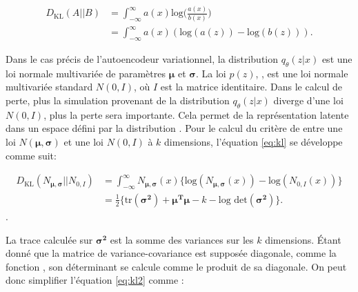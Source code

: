 \begin{equation}  \label{eq:kl}
	\begin{aligned}
		D_{\text{KL}}(A || B) &= \int_{-\infty}^{\infty} a(x) \text{log} \Big(\frac{a(x)}{b(x)}\Big)  \\
		 &= \int_{-\infty}^{\infty} a(x) (\text{log}(a(z)) - \text{log}(b(z))).
	\end{aligned}
\end{equation}

Dans le cas précis de l'autoencodeur variationnel, la distribution $q_{\theta}(z|x)$ est une loi normale multivariée de paramètres $\boldsymbol \mu$ et $\boldsymbol \sigma$. La loi $p(z)$, \DIFdelbegin {}\DIFdelend \DIFaddbegin {}\textit{}\DIFaddend , est une loi normale multivariée standard $N(0,I)$, où $I$ est la matrice identitaire. Dans le calcul de perte, plus la simulation provenant de la distribution $q_{\theta}(z|x)$ diverge d'une loi $N(0, I)$, plus la perte sera importante. Cela permet de \DIFdelbegin {}\DIFdelend \DIFaddbegin {}\DIFaddend la représentation latente dans un espace défini par la distribution \DIFdelbegin {}\DIFdelend \DIFaddbegin \textit{}\DIFaddend . Pour le calcul du critère de \DIFdelbegin {}\DIFdelend \DIFaddbegin {}\DIFaddend entre une loi $N(\boldsymbol \mu, \boldsymbol \sigma)$ et une loi $N(0, I)$ à $k$ dimensions, l'équation \ref{eq:kl} se développe comme suit:

\begin{equation}  \label{eq:kl2}
	\begin{aligned}
	D_{\text{KL}}(N_{\boldsymbol \mu, \boldsymbol \sigma} || N_{0,I}) &= \int_{-\infty}^{\infty} N_{\boldsymbol \mu, \boldsymbol \sigma}(x) \big\{\text{log}(N_{\boldsymbol \mu,\boldsymbol \sigma}(x)) - \text{log}(N_{0,I}(x))\big\} \\
		&= \frac{1}{2}\big\{\text{tr}(\boldsymbol{\sigma^2}) + \boldsymbol{\mu^T} \boldsymbol{\mu} - k - \text{log det}(\boldsymbol{\sigma^2})\big \}.
 	\end{aligned}
\end{equation}.

La trace calculée sur $\boldsymbol{\sigma^2}$ est la somme des variances sur les $k$ dimensions. Étant donné que la matrice de variance-covariance est supposée diagonale, comme la fonction \DIFdelbegin {}\DIFdelend \DIFaddbegin \textit{}\DIFaddend , son déterminant se calcule comme le produit de sa diagonale. On peut donc simplifier l'équation \ref{eq:kl2} comme \DIFaddbegin {}\DIFaddend :

